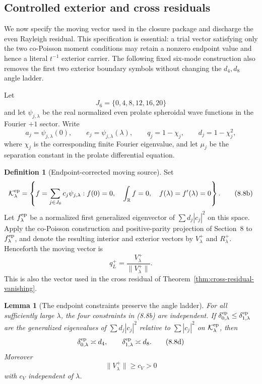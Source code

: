 \documentclass[11pt]{amsart}
\newtheorem{lemma}[theorem]{Lemma}
\theoremstyle{definition}
\newtheorem{definition}[theorem]{Definition}
\theoremstyle{remark}
\begin{document}
\subsection{Controlled exterior and cross residuals}

We now specify the moving vector used in the closure package and discharge
the even Rayleigh residual.  This specification is essential: a trial
vector satisfying only the two co-Poisson moment conditions may retain a
nonzero endpoint value and hence a literal \(t^{-1}\) exterior carrier.
The following fixed six-mode construction also removes the first two
exterior boundary symbols without changing the \(d_4,d_8\) angle ladder.

Let
\[
 J_6=\{0,4,8,12,16,20\}
\]
and let \(\psi_{j,\lambda}\) be the real normalized even prolate
spheroidal wave functions in the Fourier \(+1\) sector.  Write
\[
 a_j=\psi_{j,\lambda}(0),\qquad
 e_j=\psi_{j,\lambda}(\lambda),\qquad
 q_j=1-\chi_j,\qquad d_j=1-\chi_j^2,
\tag{8.8a}
\]
where \(\chi_j\) is the corresponding finite Fourier eigenvalue, and let
\(\mu_j\) be the separation constant in the prolate differential equation.

\begin{definition}[Endpoint-corrected moving source]
\label{def:endpoint-corrected-source}
Set
\[
 \mathcal K_\lambda^{\rm ep}
 =\left\{
 f=\sum_{j\in J_6}c_j\psi_{j,\lambda}:
 f(0)=0,\quad \int_{\mathbb R}f=0,\quad
 f(\lambda)=f'(\lambda)=0
 \right\}.
\tag{8.8b}
\]
Let \(f_\lambda^{\rm ep}\) be a normalized first generalized eigenvector
of \(\sum d_j|c_j|^2\) on this space.  Apply the co-Poisson construction
and positive-parity projection of Section~8 to \(f_\lambda^{\rm ep}\), and
denote the resulting interior and exterior vectors by
\(V_\lambda^+\) and \(R_\lambda^+\).  Henceforth the moving vector is
\[
 q_L^+=\frac{V_\lambda^+}{\|V_\lambda^+\|}.
\tag{8.8c}
\]
This is also the vector used in the cross residual of
Theorem~\ref{thm:cross-residual-vanishing}.
\end{definition}

\begin{lemma}[The endpoint constraints preserve the angle ladder]
\label{lem:endpoint-angle-ladder}
For all sufficiently large \(\lambda\), the four constraints in
(8.8b) are independent.  If
\(\delta_{0,\lambda}^{\rm ep}\le
\delta_{1,\lambda}^{\rm ep}\) are the generalized eigenvalues of
\(\sum d_j|c_j|^2\) relative to \(\sum|c_j|^2\) on
\(\mathcal K_\lambda^{\rm ep}\), then
\[
 \delta_{0,\lambda}^{\rm ep}\asymp d_4,
 \qquad
 \delta_{1,\lambda}^{\rm ep}\asymp d_8.
\tag{8.8d}
\]
Moreover
\[
 \|V_\lambda^+\|\ge c_V>0
\tag{8.8e}
\]
with \(c_V\) independent of \(\lambda\).
\end{lemma}
\end{document}
